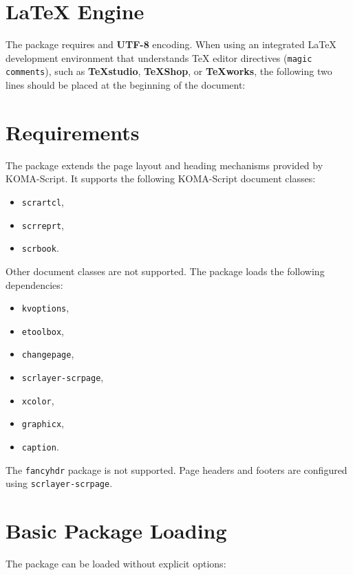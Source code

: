\documentclass[
11pt,
a4paper,
oneside
]{scrbook}
\begin{document}
\section{\LaTeX{} Engine}

The \MDWordmark package requires \LuaLaTeX{} and \textbf{UTF-8}
encoding. When using an integrated \LaTeX{} development environment that
understands \TeX{} editor directives (\texttt{magic comments}), such
as \textbf{TeXstudio}, \textbf{\TeX Shop}, or \textbf{\TeX works},
the following two lines should be placed at the beginning of the
document:





\section{Requirements}

The \MDWordmark package extends the page layout and heading mechanisms
provided by KOMA-Script.
It supports the following KOMA-Script document classes:

\begin{itemize}
	\item \texttt{scrartcl},
	\item \texttt{scrreprt},
	\item \texttt{scrbook}.
\end{itemize}
Other document classes are not supported.
The package loads the following dependencies:
\begin{itemize}
	\item \texttt{kvoptions},
	\item \texttt{etoolbox},
	\item \texttt{changepage},
	\item \texttt{scrlayer-scrpage},
	\item \texttt{xcolor},
	\item \texttt{graphicx},
	\item \texttt{caption}.
\end{itemize}
The \texttt{fancyhdr} package is not supported.
Page headers and footers are configured using
\texttt{scrlayer-scrpage}.

\section{Basic Package Loading}

The package can be loaded without explicit options:


\end{document}
